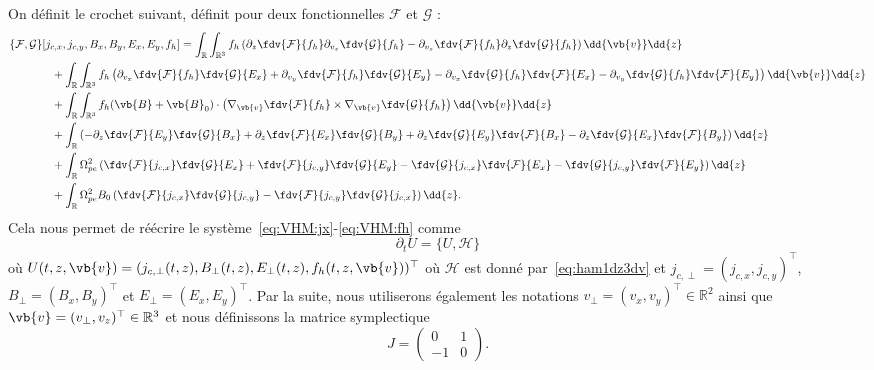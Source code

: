 On définit le crochet suivant, définit pour deux fonctionnelles $\mathcal{F}$ et $\mathcal{G}$ :
\begin{equation}
  \begin{aligned}
    \{ \mathcal{F},\mathcal{G} \}[ j_{c,x}, j_{c,y}, B_x, B_y, E_x, E_y, f_h] &=
                       \int_{\mathbb{R}}\int_{\mathbb{R}^3} f_h \left( \partial_z\fdv{\mathcal{F}}{f_h}\partial_{v_z}\fdv{\mathcal{G}}{f_h} - \partial_{v_z}\fdv{\mathcal{F}}{f_h}\partial_z\fdv{\mathcal{G}}{f_h} \right) \dd{\vb{v}}\dd{z} \\
      &\hspace{-4cm} + \int_{\mathbb{R}}\int_{\mathbb{R}^3} f_h \left(
            \partial_{v_x}\fdv{\mathcal{F}}{f_h}\fdv{\mathcal{G}}{E_x} + \partial_{v_y}\fdv{\mathcal{F}}{f_h}\fdv{\mathcal{G}}{E_y}
          - \partial_{v_x}\fdv{\mathcal{G}}{f_h}\fdv{\mathcal{F}}{E_x} - \partial_{v_y}\fdv{\mathcal{G}}{f_h}\fdv{\mathcal{F}}{E_y}
          \right) \dd{\vb{v}}\dd{z} \\
      &\hspace{-4cm} + \int_{\mathbb{R}}\int_{\mathbb{R}^3} f_h(\vb{B}+\vb{B}_0)\cdot\left( \nabla_{\vb{v}}\fdv{\mathcal{F}}{f_h}\times\nabla_{\vb{v}}\fdv{\mathcal{G}}{f_h} \right) \dd{\vb{v}}\dd{z} \\
      &\hspace{-4cm} + \int_{\mathbb{R}} \left(
          - \partial_z\fdv{\mathcal{F}}{E_y}\fdv{\mathcal{G}}{B_x} + \partial_z\fdv{\mathcal{F}}{E_x}\fdv{\mathcal{G}}{B_y}
          + \partial_z\fdv{\mathcal{G}}{E_y}\fdv{\mathcal{F}}{B_x} - \partial_z\fdv{\mathcal{G}}{E_x}\fdv{\mathcal{F}}{B_y}
          \right) \dd{z} \\
      &\hspace{-4cm} + \int_{\mathbb{R}} \Omega_{pe}^2 \left(
            \fdv{\mathcal{F}}{j_{c,x}}\fdv{\mathcal{G}}{E_x} + \fdv{\mathcal{F}}{j_{c,y}}\fdv{\mathcal{G}}{E_y}
          - \fdv{\mathcal{G}}{j_{c,x}}\fdv{\mathcal{F}}{E_x} - \fdv{\mathcal{G}}{j_{c,y}}\fdv{\mathcal{F}}{E_y}
          \right) \dd{z} \\
      &\hspace{-4cm} + \int_{\mathbb{R}} \Omega_{pe}^2B_0 \left(
            \fdv{\mathcal{F}}{j_{c,x}}\fdv{\mathcal{G}}{j_{c,y}}
          - \fdv{\mathcal{F}}{j_{c,y}}\fdv{\mathcal{G}}{j_{c,x}}
          \right) \dd{z}.
  \end{aligned}
  \label{bracket}
\end{equation}
Cela nous permet de réécrire le système~\eqref{eq:VHM:jx}-\eqref{eq:VHM:fh} comme 
$$
  \partial_t U = \{ U,\mathcal{H} \}
$$
où $U(t,z,\vb{v}) = ( j_{c,\perp}(t,z) , B_\perp(t,z) , E_\perp(t,z) , f_h(t,z,\vb{v}) )^\top$ où $\mathcal{H}$ est donné par~\eqref{eq:ham1dz3dv} et $j_{c,\perp}=(j_{c,x},j_{c,y})^\top$, $B_{\perp}=(B_{x},B_{y})^\top$ et $E_{\perp}=(E_{x},E_{y})^\top$. Par la suite, nous utiliserons également les notations $v_\perp = (v_x,v_y)^\top\in\mathbb{R}^2$ ainsi que $\vb{v} = (v_\perp,v_z)^\top\in\mathbb{R}^3$ et nous définissons la matrice symplectique 
$$
  J = \begin{pmatrix}
     0 & 1 \\
    -1 & 0
  \end{pmatrix}.
$$
